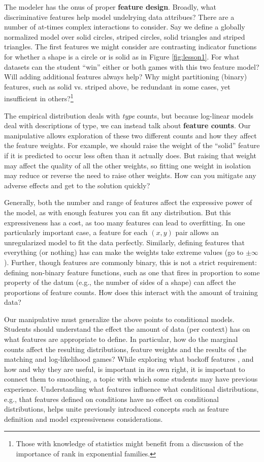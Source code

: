 \documentclass[11pt,letterpaper]{article}
\begin{document}
The modeler has the onus of proper \textbf{feature design}. Broadly, what discriminative features 
help model undelrying data attribues? There are a number of at-times complex interactions 
to consider. Say we define a globally 
normalized model over solid circles, striped circles, solid triangles and striped triangles. 
The first features we might consider are contrasting indicator functions for whether a shape
is a circle or is solid as in Figure \ref{fig:lesson1}. For what datasets can the student ``win'' either or both games with this two feature model? 
Will adding additional features always help? Why might partitioning (binary) 
features, such as solid vs. striped above, be redundant in some 
cases, yet insufficient in others?\footnote{Those with knowledge of statistics might benefit 
from a discussion of the importance of rank in exponential families.}

The empirical distribution deals with \textit{type} counts, but because log-linear models 
deal with descriptions of type, we can instead talk about \textbf{feature counts}. Our 
manipulative allows exploration of these two different counts and how they affect the 
feature weights. For example, we should raise the weight of the “solid” feature if it is 
predicted to occur less often than it actually does. But raising that weight 
may affect the quality of all the other weights, so fitting one weight in
isolation may reduce or reverse the need to raise other weights. How can you mitigate any 
adverse effects and get to the solution quickly?

Generally, both the number and range of features affect the expressive 
power of the model, as with enough features you can fit any distribution. But this expressiveness 
has a cost, as too many features can lead to overfitting. 
In one particularly important case, a feature for each $(x,y)$ pair allows an unregularized model to fit the 
data perfectly. 
Similarly, defining features that everything (or nothing) has can make the weights 
take extreme values (go to $\pm \infty$). Further, though features are commonly binary, 
this is not a strict requirement: defining non-binary feature functions, such as one that fires in 
proportion to some property of the datum (e.g., the number of sides of a shape) can affect the
proportions of feature counts. How does this interact with the amount of training data?

Our manipulative must generalize the above points to conditional models. Students should 
understand the effect the amount of data (per context) has on what features are appropriate to define. 
In particular, how do the marginal counts affect the resulting distributions, feature 
weights and the results of the matching and log-likelihood games? 
While exploring what backoff features , and how and why they are useful, is important in its own right, 
it is important to connect them to smoothing, a topic with which some students may have previous experience. 
Understanding what features influence 
what conditional distributions, e.g., that features defined on conditions have no effect on conditional distributions, 
helps unite previously introduced concepts such as feature definition and model expressiveness considerations.
\end{document}
